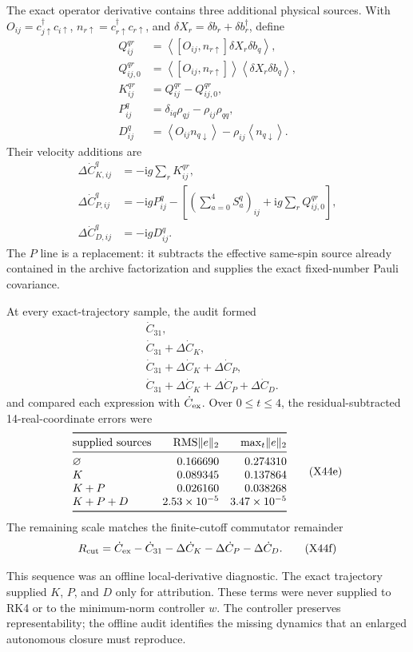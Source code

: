 \documentclass[9pt,letterpaper,twocolumn]{article}
\newcommand{\ii}{\mathrm i}
\begin{document}
The exact operator derivative contains three additional physical sources.
With \(O_{ij}=c_{j\uparrow}^\dagger c_{i\uparrow}\),
\(n_{r\uparrow}=c_{r\uparrow}^\dagger c_{r\uparrow}\), and
\(\delta X_r=\delta b_r+\delta b_r^\dagger\), define
{\footnotesize
\[
\begin{aligned}
Q^{qr}_{ij}
&=\left\langle[O_{ij},n_{r\uparrow}]\delta X_r\delta b_q\right\rangle,\\
Q^{qr}_{ij,0}
&=\left\langle[O_{ij},n_{r\uparrow}]\right\rangle
  \left\langle\delta X_r\delta b_q\right\rangle,\\
K^{qr}_{ij}&=Q^{qr}_{ij}-Q^{qr}_{ij,0},\\
P^q_{ij}&=\delta_{iq}\rho_{qj}-\rho_{ij}\rho_{qq},\\
D^q_{ij}&=\left\langle O_{ij}n_{q\downarrow}\right\rangle
-\rho_{ij}\left\langle n_{q\downarrow}\right\rangle.
\end{aligned}
\tag{X44c}
\]
}
Their velocity additions are
{\footnotesize
\[
\begin{aligned}
\Delta\dot C^q_{K,ij}
&=-\ii g\sum_rK^{qr}_{ij},\\
\Delta\dot C^q_{P,ij}
&=-\ii gP^q_{ij}
-\left[\left(\sum_{a=0}^{4}S_a^q\right)_{ij}
+\ii g\sum_rQ^{qr}_{ij,0}\right],\\
\Delta\dot C^q_{D,ij}
&=-\ii gD^q_{ij}.
\end{aligned}
\tag{X44d}
\]
}
The \(P\) line is a replacement: it subtracts the effective same-spin source
already contained in the archive factorization and supplies the exact
fixed-number Pauli covariance.

At every exact-trajectory sample, the audit formed
\[
\begin{aligned}
&\dot C_{31},\\
&\dot C_{31}+\Delta\dot C_K,\\
&\dot C_{31}+\Delta\dot C_K+\Delta\dot C_P,\\
&\dot C_{31}+\Delta\dot C_K+\Delta\dot C_P+\Delta\dot C_D.
\end{aligned}
\]
and compared each expression with \(\dot C_{\rm ex}\).  Over
\(0\leq t\leq4\), the residual-subtracted 14-real-coordinate errors were
\[
\begin{array}{@{}lrr@{}}
\toprule
\text{supplied sources}&\operatorname{RMS}\lVert e\rVert_2
&\max_t\lVert e\rVert_2\\
\midrule
\varnothing&0.166690&0.274310\\
K&0.089345&0.137864\\
K+P&0.026160&0.038268\\
K+P+D&2.53\times10^{-5}&3.47\times10^{-5}\\
\bottomrule
\end{array}
\tag{X44e}
\]
The remaining scale matches the finite-cutoff commutator remainder
\[
R_{\rm cut}
=\dot C_{\rm ex}-\dot C_{31}
-\Delta\dot C_K-\Delta\dot C_P-\Delta\dot C_D.
\tag{X44f}
\]

This sequence was an offline local-derivative diagnostic.  The exact
trajectory supplied \(K\), \(P\), and \(D\) only for attribution.  These
terms were never supplied to RK4 or to the minimum-norm controller \(w\).
The controller preserves representability; the offline audit identifies the
missing dynamics that an enlarged autonomous closure must reproduce.
\end{document}
